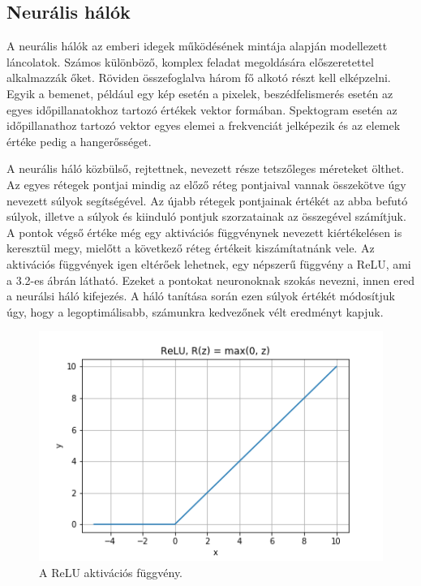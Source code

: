 
\subsection{Neurális hálók}

A neurális hálók az emberi idegek működésének mintája alapján modellezett láncolatok. Számos különböző, komplex feladat megoldására előszeretettel alkalmazzák őket. Röviden összefoglalva három fő alkotó részt kell elképzelni. Egyik a bemenet, például egy kép esetén a pixelek, beszédfelismerés esetén az egyes időpillanatokhoz tartozó értékek vektor formában. Spektogram esetén az időpillanathoz tartozó vektor egyes elemei a frekvenciát jelképezik és az elemek értéke pedig a hangerősséget.

A neurális háló közbülső, rejtettnek, nevezett része tetszőleges méreteket ölthet. Az egyes rétegek pontjai mindig az előző réteg pontjaival vannak összekötve úgy nevezett súlyok segítségével. Az újabb rétegek pontjainak értékét az abba befutó súlyok, illetve a súlyok és kiinduló pontjuk szorzatainak az összegével számítjuk. A pontok végső értéke még egy aktivációs függvénynek nevezett kiértékelésen is keresztül megy, mielőtt a következő réteg értékeit kiszámítatnánk vele. Az aktivációs függvények igen eltérőek lehetnek, egy népszerű függvény a ReLU, ami a 3.2-es ábrán látható. Ezeket a pontokat neuronoknak szokás nevezni, innen ered a neurálsi háló kifejezés. A háló tanítása során ezen súlyok értékét módosítjuk úgy, hogy a legoptimálisabb, számunkra kedvezőnek vélt eredményt kapjuk.

\begin{figure}[!ht]
\centering
\includegraphics[width=125mm, keepaspectratio]{figures/ReLU.png}
\caption{A ReLU aktivációs függvény.}
\label{fig:TeXstudio}
\end{figure}


